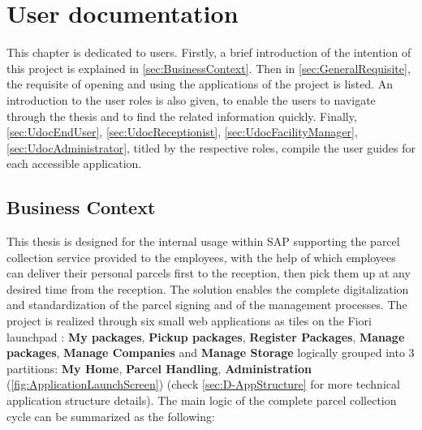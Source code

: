 \chapter{User documentation}
\label{ch:user}

This chapter is dedicated to users. Firstly, a brief introduction of the intention of this project is explained in \autoref{sec:BusinessContext}. Then in \autoref{sec:GeneralRequisite}, the requisite of opening and using the applications of the project is listed. An introduction to the user roles is also given, to enable the users to navigate through the thesis and to find the related information quickly.
Finally, \autoref{sec:UdocEndUser}, \autoref{sec:UdocReceptionist}, \autoref{sec:UdocFacilityManager}, \autoref{sec:UdocAdministrator}, titled by the respective roles, compile the user guides for each accessible application.

\section{Business Context}
\label{sec:BusinessContext}

This thesis is designed for the internal usage within SAP supporting the parcel collection service provided to the employees, with the help of which employees can deliver their personal parcels first to the reception, then pick them up at any desired time from the reception. The solution enables the complete digitalization and standardization of the parcel signing and of the management processes. The project is realized through six small web applications as tiles on the Fiori launchpad \cite{flp}: \textbf{My packages}, \textbf{Pickup packages}, \textbf{Register Packages}, \textbf{Manage packages}, \textbf{Manage Companies} and \textbf{Manage Storage} logically grouped into 3 partitions: \textbf{My Home}, \textbf{Parcel Handling}, \textbf{Administration} (\autoref{fig:ApplicationLaunchScreen}) (check \autoref{sec:D-AppStructure} for more technical 
 application structure details).
The main logic of the complete parcel collection cycle can be summarized as the following:


